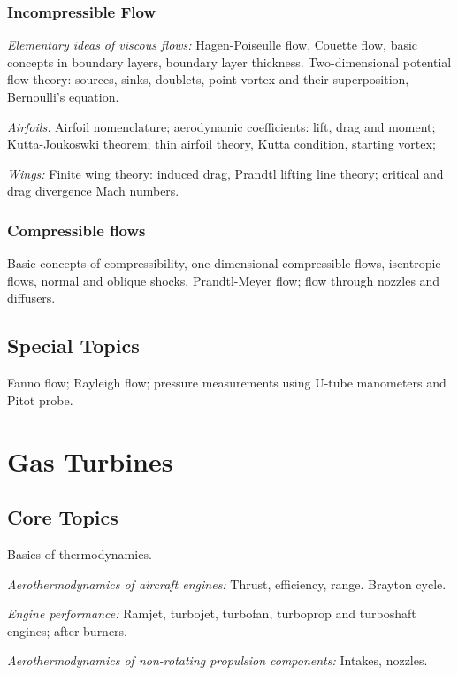 \subsubsection{Incompressible Flow}

\noindent\textit{Elementary ideas of viscous flows:} Hagen-Poiseulle flow, Couette flow, basic concepts in boundary layers, boundary layer thickness. Two-dimensional potential flow theory: sources, sinks, doublets, point vortex and their superposition, Bernoulli's equation.

\noindent\textit{Airfoils:} Airfoil nomenclature; aerodynamic coefficients: lift, drag and moment; Kutta-Joukoswki theorem; thin airfoil theory, Kutta condition, starting vortex;

\noindent\textit{Wings:} Finite wing theory: induced drag, Prandtl lifting line theory; critical and drag divergence Mach numbers.

\subsubsection{Compressible flows}
Basic concepts of compressibility, one-dimensional compressible flows, isentropic flows, normal and oblique shocks, Prandtl-Meyer flow; flow through nozzles and diffusers.

\subsection{Special Topics}
Fanno flow; Rayleigh flow; pressure measurements using U-tube manometers and Pitot probe.

\section{Gas Turbines}

\subsection{Core Topics}

Basics of thermodynamics.

\noindent\textit{Aerothermodynamics of aircraft engines:} Thrust, efficiency, range. Brayton cycle.

\noindent\textit{Engine performance:} Ramjet, turbojet, turbofan, turboprop and turboshaft engines; after-burners.

\noindent\textit{Aerothermodynamics of non-rotating propulsion components:} Intakes, nozzles.

